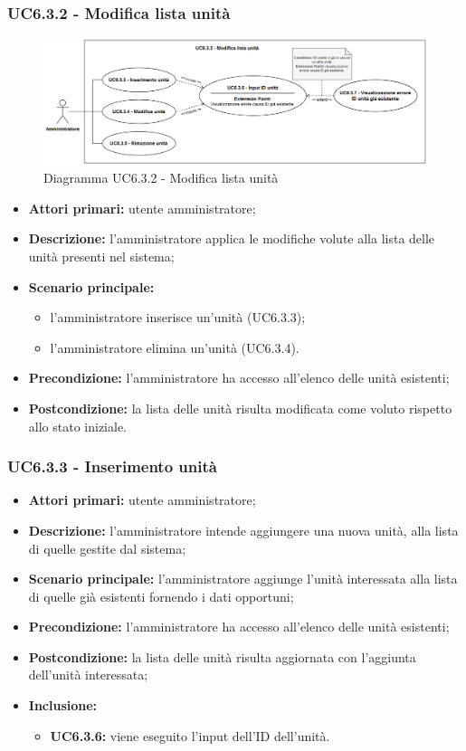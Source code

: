 \subsubsection{UC6.3.2 - Modifica lista unità}
	\begin{figure}[H]
		\centering
		\includegraphics[width=17cm]{images/UC6.3.2.png}
		\caption{Diagramma UC6.3.2 - Modifica lista unità}
	\end{figure}
	\begin{itemize}
		\item \textbf{Attori primari:} utente amministratore;
		\item \textbf{Descrizione:} l'amministratore applica le modifiche volute alla lista delle unità presenti nel sistema;
		\item \textbf{Scenario principale:} 
		\begin{itemize}
			\item l'amministratore inserisce un'unità (UC6.3.3);
			\item l'amministratore elimina un'unità (UC6.3.4).
		\end{itemize}
		\item \textbf{Precondizione:} l'amministratore ha accesso all'elenco delle unità esistenti;
		\item \textbf{Postcondizione:} la lista delle unità risulta modificata come voluto rispetto allo stato iniziale.
	\end{itemize}

\subsubsection{UC6.3.3 - Inserimento unità}
	\begin{itemize}
		\item \textbf{Attori primari:} utente amministratore;
		\item \textbf{Descrizione:} l'amministratore intende aggiungere una nuova unità, alla lista di quelle gestite dal sistema;
		\item \textbf{Scenario principale:} l'amministratore aggiunge l'unità interessata alla lista di quelle già esistenti fornendo i dati opportuni;
		\item \textbf{Precondizione:} l'amministratore ha accesso all'elenco delle unità esistenti;
		\item \textbf{Postcondizione:} la lista delle unità risulta aggiornata con l'aggiunta dell'unità interessata;
		\item \textbf{Inclusione:} 
		\begin{itemize}
			\item \textbf{UC6.3.6:} viene eseguito l'input dell'ID dell'unità.
		\end{itemize}
	\end{itemize}

